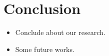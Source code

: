 \section{Conclusion}
\begin{itemize}
	\item Conclude about our research.
	\item Some future works.
\end{itemize}